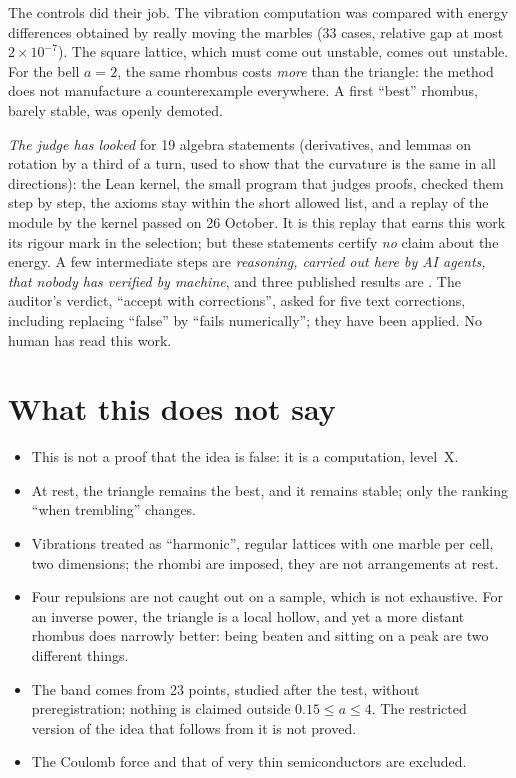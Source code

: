 The controls did their job. The vibration computation was compared with energy differences
obtained by really moving the marbles (33 cases, relative gap at most $2\times10^{-7}$). The
square lattice, which must come out unstable, comes out unstable. For the bell $a=2$, the same
rhombus costs \emph{more} than the triangle: the method does not manufacture a counterexample
everywhere. A first ``best'' rhombus, barely stable, was openly demoted.

 \emph{The judge has looked} for 19 algebra statements (derivatives, and lemmas on
rotation by a third of a turn, used to show that the curvature is the same in all directions):
the Lean kernel, the small program that judges proofs, checked them step by step, the axioms
stay within the short allowed list, and a replay of the module by the kernel passed on 26
October. It is this replay that earns this work its rigour mark in the selection; but these
statements certify \emph{no} claim about the energy. A few intermediate steps are 
\emph{reasoning, carried out here by AI agents, that nobody has verified by machine}, and three
published results are . The auditor's verdict, ``accept with corrections'', asked for
five text corrections, including replacing ``false'' by ``fails numerically''; they have been
applied. No human has read this work.

\section*{What this does not say}

\begin{limite}
\begin{itemize}
\item This is not a proof that the idea is false: it is a computation, level~X.
\item At rest, the triangle remains the best, and it remains stable; only the ranking ``when
  trembling'' changes.
\item Vibrations treated as ``harmonic'', regular lattices with one marble per cell, two
  dimensions; the rhombi are imposed, they are not arrangements at rest.
\item Four repulsions are not caught out on a sample, which is not exhaustive. For an inverse
  power, the triangle is a local hollow, and yet a more distant rhombus does narrowly better:
  being beaten and sitting on a peak are two different things.
\item The band comes from 23 points, studied after the test, without preregistration; nothing
  is claimed outside $0.15\le a\le4$. The restricted version of the idea that follows from it is
  not proved.
\item The Coulomb force and that of very thin semiconductors are excluded.
\end{itemize}
\end{limite}

